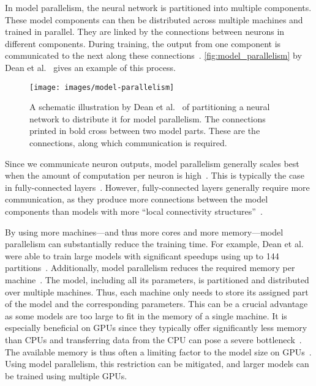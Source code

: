 \documentclass[conference]{IEEEtran}
\begin{document}
In model parallelism, the neural network is partitioned into multiple components.
These model components can then be distributed across multiple machines and trained in parallel.
They are linked by the connections between neurons in different components.
During training, the output from one component is communicated to the next along these connections~\cite{dean2012-Large-scale-distributed}.
\autoref{fig:model_parallelism} by Dean et al.~\cite{dean2012-Large-scale-distributed} gives an example of this process.

\begin{figure}[ht]
\centering
\texttt{[image: images/model-parallelism]}
\caption{
A schematic illustration by Dean et al.~\cite{dean2012-Large-scale-distributed} of partitioning a neural network to distribute it for model parallelism.
The connections printed in bold cross between two model parts.
These are the connections, along which communication is required.
}
\label{fig:model_parallelism}
\end{figure}

Since we communicate neuron outputs, model parallelism generally scales best when the amount of computation per neuron is high~\cite{krizhevsky2014-One-weird-trick}.
This is typically the case in fully-connected layers~\cite{krizhevsky2014-One-weird-trick}.
However, fully-connected layers generally require more communication, as they produce more connections between the model components than models with more ``local connectivity structures''~\cite{dean2012-Large-scale-distributed}.

By using more machines---and thus more cores and more memory---model parallelism can substantially reduce the training time.
For example, Dean et al. were able to train large models with significant speedups using up to 144 partitions~\cite{dean2012-Large-scale-distributed}.
%
Additionally, model parallelism reduces the required memory per machine~\cite{dean2012-Large-scale-distributed}.
The model, including all its parameters, is partitioned and distributed over multiple machines.
Thus, each machine only needs to store its assigned part of the model and the corresponding parameters.
%
This can be a crucial advantage as some models are too large to fit in the memory of a single machine.
It is especially beneficial on GPUs since they typically offer significantly less memory than CPUs and transferring data from the CPU can pose a severe bottleneck~\cite{dean2012-Large-scale-distributed}.
The available memory is thus often a limiting factor to the model size on GPUs~\cite{dean2012-Large-scale-distributed,chilimbi2014-Project-Adam}.
Using model parallelism, this restriction can be mitigated, and larger models can be trained using multiple GPUs.
\end{document}
